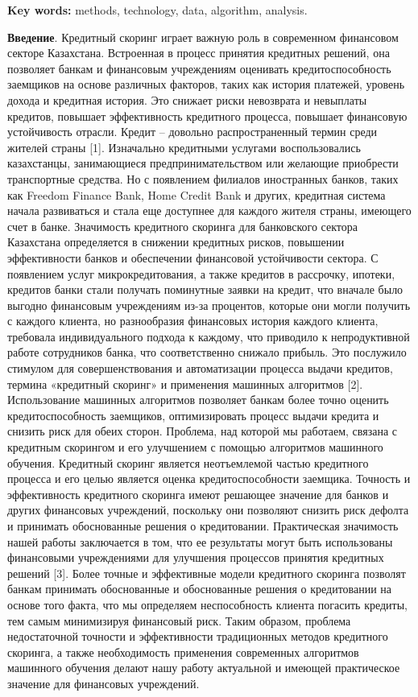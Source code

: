 {\bfseries Key words:} methods, technology, data, algorithm, analysis.

{\bfseries Введение}. Кредитный скоринг играет важную роль в современном
финансовом секторе Казахстана. Встроенная в процесс принятия кредитных
решений, она позволяет банкам и финансовым учреждениям оценивать
кредитоспособность заемщиков на основе различных факторов, таких как
история платежей, уровень дохода и кредитная история. Это снижает риски
невозврата и невыплаты кредитов, повышает эффективность кредитного
процесса, повышает финансовую устойчивость отрасли. Кредит -- довольно
распространенный термин среди жителей страны {[}1{]}. Изначально
кредитными услугами воспользовались казахстанцы, занимающиеся
предпринимательством или желающие приобрести транспортные средства. Но с
появлением филиалов иностранных банков, таких как Freedom Finance Bank,
Home Credit Bank и других, кредитная система начала развиваться и стала
еще доступнее для каждого жителя страны, имеющего счет в банке.
Значимость кредитного скоринга для банковского сектора Казахстана
определяется в снижении кредитных рисков, повышении эффективности банков
и обеспечении финансовой устойчивости сектора. С появлением услуг
микрокредитования, а также кредитов в рассрочку, ипотеки, кредитов банки
стали получать поминутные заявки на кредит, что вначале было выгодно
финансовым учреждениям из-за процентов, которые они могли получить с
каждого клиента, но разнообразия финансовых история каждого клиента,
требовала индивидуального подхода к каждому, что приводило к
непродуктивной работе сотрудников банка, что соответственно снижало
прибыль. Это послужило стимулом для совершенствования и автоматизации
процесса выдачи кредитов, термина «кредитный скоринг» и применения
машинных алгоритмов {[}2{]}. Использование машинных алгоритмов позволяет
банкам более точно оценить кредитоспособность заемщиков, оптимизировать
процесс выдачи кредита и снизить риск для обеих сторон. Проблема, над
которой мы работаем, связана с кредитным скорингом и его улучшением с
помощью алгоритмов машинного обучения. Кредитный скоринг является
неотъемлемой частью кредитного процесса и его целью является оценка
кредитоспособности заемщика. Точность и эффективность кредитного
скоринга имеют решающее значение для банков и других финансовых
учреждений, поскольку они позволяют снизить риск дефолта и принимать
обоснованные решения о кредитовании. Практическая значимость нашей
работы заключается в том, что ее результаты могут быть использованы
финансовыми учреждениями для улучшения процессов принятия кредитных
решений {[}3{]}. Более точные и эффективные модели кредитного скоринга
позволят банкам принимать обоснованные и обоснованные решения о
кредитовании на основе того факта, что мы определяем неспособность
клиента погасить кредиты, тем самым минимизируя финансовый риск. Таким
образом, проблема недостаточной точности и эффективности традиционных
методов кредитного скоринга, а также необходимость применения
современных алгоритмов машинного обучения делают нашу работу актуальной
и имеющей практическое значение для финансовых учреждений.

